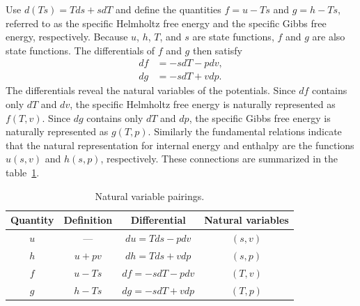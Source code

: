 Use $d(Ts)=Tds+sdT$ and define the quantities $f=u-Ts$ and $g=h-Ts$, referred to as the specific Helmholtz free energy and the specific Gibbs free energy, respectively. Because $u$, $h$, $T$, and $s$ are state functions, $f$ and $g$ are
also state functions. The differentials of $f$ and $g$ then satisfy
\begin{align}
    \label{eq:df-helmholtz}
    df&=-sdT-pdv,\\
    \label{eq:dg-gibbs}
    dg&=-sdT+vdp.
\end{align}
The differentials reveal the natural variables of the potentials. Since $df$
contains only $dT$ and $dv$, the specific Helmholtz free energy is naturally
represented as $f(T,v)$. Since $dg$ contains only $dT$ and $dp$, the specific
Gibbs free energy is naturally represented as $g(T,p)$. Similarly the fundamental relations indicate that the natural representation for internal energy and enthalpy are the functions $u(s,v)$ and $h(s,p)$, respectively. These connections are summarized in the table~\ref{tab:natural-variable-pairings}.
\begin{table}[!htb]
    \centering
    \begin{threeparttable}
    \caption{Natural variable pairings.}
    \begin{tabular}{cccc}
        \toprule
        Quantity & Definition & Differential & Natural variables \\
        \midrule
        $u$ & --- & $du=Tds-pdv$ & $(s,v)$ \\
        $h$ & $u+pv$ & $dh=Tds+vdp$ & $(s,p)$ \\
        $f$ & $u-Ts$ & $df=-sdT-pdv$ & $(T,v)$ \\
        $g$ & $h-Ts$ & $dg=-sdT+vdp$ & $(T,p)$ \\
        \bottomrule
    \end{tabular}
    \end{threeparttable}
    \label{tab:natural-variable-pairings}
\end{table}

